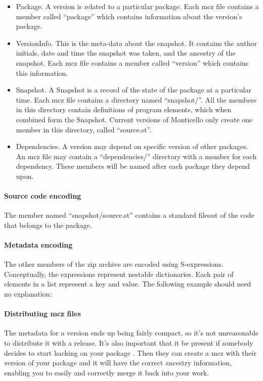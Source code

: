\documentclass[a4paper,10pt,twoside]{book}
\begin{document}
\begin{itemize}
\item Package. A version is related to a particular package. Each mcz file contains a member called ``package'' which contains information about the version's package.

\item VersionInfo. This is the meta-data about the snapshot. It contains the author initials, date and time the snapshot was taken, and the ancestry of the snapshot. Each mcz file contains a member called ``version'' which contains this information.
\item Snapshot. A Snapshot is a record of the state of the package at a particular time. Each mcz file contains a directory named ``snapshot/''. All the members in this directory contain definitions of program elements, which when combined form the Snapshot. Current versions of Monticello only create one member in this directory, called ``source.st''.
\item Dependencies. A version may depend on specific version of other packages. An mcz file may contain a ``dependencies/'' directory with a member for each dependency. These members will be named after each package they depend upon.
\end{itemize}

\paragraph{Source code encoding}

The member named ``snapshot/source.st'' contains a standard fileout of the code that belongs to the package.

\paragraph{Metadata encoding}

The other members of the zip archive are encoded using S-expressions. Conceptually, the expressions represent nestable dictionaries. Each pair of elements in a list represent a key and value. The following example should need no explanation:


\paragraph{Distributing mcz files}

The metadata for a version ends up being fairly compact, so it's not unreasonable to distribute it with a release. It's also important that it be present if somebody decides to start hacking on your package . Then they can create a mcz with their version of your package and it will have the correct ancestry information, enabling you to easily and correctly merge it back into your work.
\end{document}
